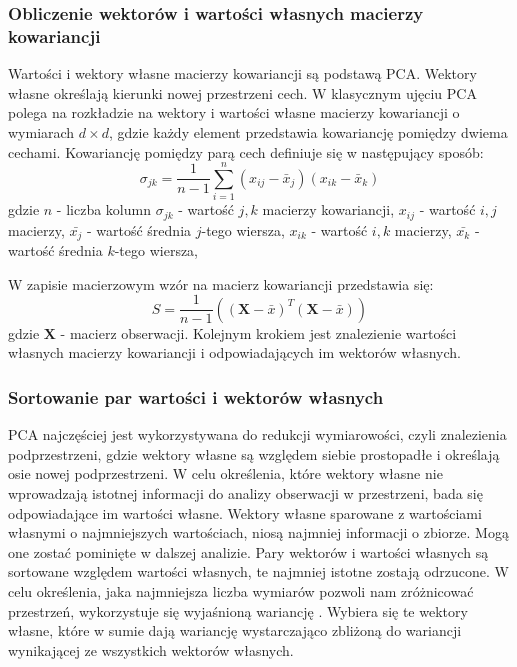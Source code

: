 \documentclass[a4paper,12pt,twoside,openany]{report}
\renewcommand{\vec}[1]{\bm{#1}}
\begin{document}
\subsubsection{Obliczenie wektorów i wartości własnych macierzy kowariancji}
Wartości i wektory własne macierzy kowariancji są podstawą PCA.
Wektory własne określają kierunki nowej przestrzeni cech.
W klasycznym ujęciu PCA polega na rozkładzie na wektory i wartości własne macierzy kowariancji o wymiarach $d \times d$,
gdzie każdy element przedstawia kowariancję pomiędzy dwiema cechami. 
Kowariancję pomiędzy parą cech definiuje się w następujący sposób:
\begin{equation}
	\sigma_{jk}=\frac{1}{n - 1}\sum_{i=1}^{n}(x_{ij}-\bar x_j)(x_{ik} - \bar x_k)
\end{equation}
gdzie 
$n$ - liczba kolumn
$\sigma_{jk}$ - wartość $j,k$ macierzy kowariancji,
$x_{ij}$ - wartość $i,j$ macierzy, 
$\bar{x_j}$ - wartość średnia $j$-tego wiersza,
$x_{ik}$ - wartość $i,k$ macierzy, 
$\bar{x_k}$ - wartość średnia $k$-tego wiersza,

W zapisie macierzowym wzór na macierz kowariancji przedstawia się:
\begin{equation}
	S=\frac{1}{n - 1}\left((\vec{X}-\bar x)^T(\vec{X} - \bar x)\right)
\end{equation}
gdzie $\vec X$ - macierz obserwacji.
Kolejnym krokiem jest znalezienie wartości własnych macierzy kowariancji i odpowiadających im wektorów własnych.
\subsubsection{Sortowanie par wartości i wektorów własnych}
PCA najczęściej jest wykorzystywana do redukcji wymiarowości, 
czyli znalezienia podprzestrzeni, gdzie wektory własne są względem siebie prostopadłe 
i określają osie nowej podprzestrzeni.
W celu określenia, które wektory własne nie wprowadzają istotnej informacji do analizy obserwacji w przestrzeni, bada się odpowiadające im wartości własne.
Wektory własne sparowane z wartościami własnymi o najmniejszych wartościach, 
niosą najmniej informacji o zbiorze. 
Mogą one zostać pominięte w dalszej analizie.
Pary wektorów i wartości własnych są sortowane względem wartości własnych,
te najmniej istotne zostają odrzucone.
W celu określenia, jaka najmniejsza liczba wymiarów pozwoli nam zróżnicować przestrzeń,
wykorzystuje się wyjaśnioną wariancję \cite{Bro2014}.
Wybiera się te wektory własne, które w sumie dają wariancję wystarczająco zbliżoną do wariancji wynikającej ze wszystkich wektorów własnych.
\end{document}
